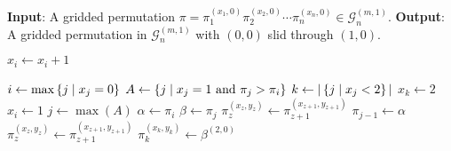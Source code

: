 {
\setphaserulewidth{.7pt}

\begin{algorithmic}[1]
\Statex \textbf{Input}: A gridded permutation $\pi = \pi_1^{(x_1,0)}\pi_2^{(x_2,0)} \cdots \pi_n^{(x_n,0)} \in \mathcal{G}^{(m,1)}_n$.
\Statex \textbf{Output}: A gridded permutation in $\mathcal{G}_n^{(m,1)}$ with $(0,0)$ slid through $(1,0)$.
        \State {} 
    \EndIf
    
        \State $x_i \gets x_i + 1$
    \EndFor
    
        \State $i \gets \max\left\{j \mid x_j = 0\right\}$
        \State $A \gets \left\{j \mid x_j = 1 \text{ and } \pi_j > \pi_i\right\}$
        \State $k \gets |\left\{j \mid x_j < 2\right\}|$
            \State $x_k \gets 2$
            \State $x_i \gets 1$
        \Else
            \State $j \gets \max(A)$
            \State $\alpha \gets \pi_i$
            \State $\beta \gets \pi_j$
                \State $\pi_{z}^{(x_z,y_z)} \gets \pi_{z+1}^{(x_{z+1},y_{z+1})}$
            \EndFor
            \State $\pi_{j-1} \gets \alpha$
                \State $\pi_{z}^{(x_z,y_z)} \gets \pi_{z+1}^{(x_{z+1},y_{z+1})}$
            \EndFor
            \State $\pi_{k}^{(x_k,y_k)} \gets \beta^{(2,0)}$
        \EndIf
    \EndWhile
    \State {}
\EndProcedure
\end{algorithmic}

}